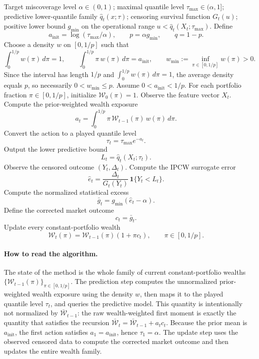 \documentclass[11pt]{article}
\newcommand{\1}{\mathbf{1}}
\begin{document}
\begin{algorithm}[ht]
\caption{Survival Portfolio Method}
\begin{algorithmic}[1]
\Require Target miscoverage level $\alpha\in(0,1)$; maximal quantile level $\tau_{\max}\in(\alpha,1]$; predictive lower-quantile family $\hat q_t(x;\tau)$; censoring survival function $G_t(u)$; positive lower bound $g_{\min}$ on the operational range $u<\hat q_t(X_t;\tau_{\max})$.
\State Define
\[
a_{\mathrm{init}}=\log(\tau_{\max}/\alpha),
\qquad
p=\alpha g_{\min},
\qquad
q=1-p.
\]
\State Choose a density \(w\) on \([0,1/p]\) such that
\[
\int_0^{1/p} w(\pi)\,d\pi=1,
\qquad
\int_0^{1/p}\pi\,w(\pi)\,d\pi=a_{\mathrm{init}},
\qquad
w_{\min}:=\inf_{\pi\in[0,1/p]}w(\pi)>0.
\]
Since the interval has length \(1/p\) and \(\int_0^{1/p} w(\pi)\,d\pi=1\), the average density equals \(p\), so necessarily \(0<w_{\min}\le p\).
\State Assume \(0<a_{\mathrm{init}}<1/p\). For each portfolio fraction $\pi\in[0,1/p]$, initialize $\mathcal W_0(\pi)=1$.
  \State Observe the feature vector $X_t$.
  \State Compute the prior-weighted wealth exposure
  \[
  a_t
  =
  \int_0^{1/p}\pi\,\mathcal W_{t-1}(\pi)\,w(\pi)\,d\pi.
  \]
  \State Convert the action to a played quantile level
  \[
  \tau_t=\tau_{\max}e^{-a_t}.
  \]
  \State Output the lower predictive bound
  \[
  L_t=\hat q_t(X_t;\tau_t).
  \]
  \State Observe the censored outcome $(Y_t,\Delta_t)$.
  \State Compute the IPCW surrogate error
  \[
  \hat e_t=\frac{\Delta_t}{G_t(Y_t)}\,\1\{Y_t< L_t\}.
  \]
  \State Compute the normalized statistical excess
  \[
  \bar g_t=g_{\min}(\hat e_t-\alpha).
  \]
  \State Define the corrected market outcome
  \[
  c_t=\bar g_t.
  \]
  \State Update every constant-portfolio wealth
  \[
  \mathcal W_t(\pi)=\mathcal W_{t-1}(\pi)(1+\pi c_t),
  \qquad
  \pi\in[0,1/p].
  \]
\EndFor
\end{algorithmic}
\end{algorithm}

\paragraph{How to read the algorithm.}
The state of the method is the whole family of current constant-portfolio wealths $\{\mathcal W_{t-1}(\pi)\}_{\pi\in[0,1/p]}$. The prediction step computes the unnormalized prior-weighted wealth exposure using the density \(w\), then maps it to the played quantile level \(\tau_t\), and queries the predictive model. This quantity is intentionally not normalized by \(\bar{\mathcal W}_{t-1}\): the raw wealth-weighted first moment is exactly the quantity that satisfies the recursion \(\bar{\mathcal W}_t=\bar{\mathcal W}_{t-1}+a_t c_t\). Because the prior mean is \(a_{\mathrm{init}}\), the first action satisfies \(a_1=a_{\mathrm{init}}\), hence \(\tau_1=\alpha\). The update step uses the observed censored data to compute the corrected market outcome and then updates the entire wealth family.
\end{document}
